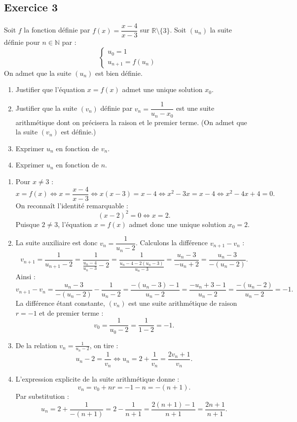 \documentclass[11pt,a4paper]{article}
\newcommand{\N}{\mathbb{N}}
\newcommand{\R}{\mathbb{R}}
\begin{document}
\subsection*{Exercice 3}
Soit $f$ la fonction définie par $f(x) = \dfrac{x - 4}{x - 3}$ sur $\R \setminus \{3\}$.
Soit $(u_n)$ la suite définie pour $n \in \N$ par :
\[
\begin{cases}
u_0 = 1\\
u_{n+1} = f(u_n)
\end{cases}
\]
On admet que la suite $(u_n)$ est bien définie.
\begin{enumerate}
    \item Justifier que l'équation $x = f(x)$ admet une unique solution $x_0$.
    \item Justifier que la suite $(v_n)$ définie par $v_n = \dfrac{1}{u_n - x_0}$ est une suite arithmétique dont on précisera la raison et le premier terme. (On admet que la suite $(v_n)$ est définie.)
    \item Exprimer $u_n$ en fonction de $v_n$.
    \item Exprimer $u_n$ en fonction de $n$.
\end{enumerate}

\begin{correctionbox}
\begin{enumerate}
    \item Pour $x \ne 3$ :
    \[
    x = f(x) \iff x = \frac{x-4}{x-3} \iff x(x-3) = x-4 \iff x^2 - 3x = x - 4 \iff x^2 - 4x + 4 = 0.
    \]
    On reconnaît l'identité remarquable :
    \[
    (x-2)^2 = 0 \iff x = 2.
    \]
    Puisque $2 \ne 3$, l'équation $x = f(x)$ admet donc une unique solution $x_0 = 2$.
    \item La suite auxiliaire est donc $v_n = \dfrac{1}{u_n - 2}$. Calculons la différence $v_{n+1} - v_n$ :
    \[
    v_{n+1} = \frac{1}{u_{n+1} - 2} = \frac{1}{\frac{u_n - 4}{u_n - 3} - 2} = \frac{1}{\frac{u_n - 4 - 2(u_n - 3)}{u_n - 3}} = \frac{u_n - 3}{-u_n + 2} = \frac{u_n - 3}{-(u_n - 2)}.
    \]
    Ainsi :
    \[
    v_{n+1} - v_n = \frac{u_n - 3}{-(u_n - 2)} - \frac{1}{u_n - 2} = \frac{-(u_n - 3) - 1}{u_n - 2} = \frac{-u_n + 3 - 1}{u_n - 2} = \frac{-(u_n - 2)}{u_n - 2} = -1.
    \]
    La différence étant constante, $(v_n)$ est une suite arithmétique de raison $r = -1$ et de premier terme :
    \[
    v_0 = \frac{1}{u_0 - 2} = \frac{1}{1 - 2} = -1.
    \]
    \item De la relation $v_n = \frac{1}{u_n - 2}$, on tire :
    \[
    u_n - 2 = \frac{1}{v_n} \iff u_n = 2 + \frac{1}{v_n} = \frac{2v_n + 1}{v_n}.
    \]
    \item L'expression explicite de la suite arithmétique donne :
    \[
    v_n = v_0 + n r = -1 - n = -(n+1).
    \]
    Par substitution :
    \[
    u_n = 2 + \frac{1}{-(n+1)} = 2 - \frac{1}{n+1} = \frac{2(n+1) - 1}{n+1} = \frac{2n + 1}{n+1}.
    \]
\end{enumerate}
\end{correctionbox}
\end{document}
